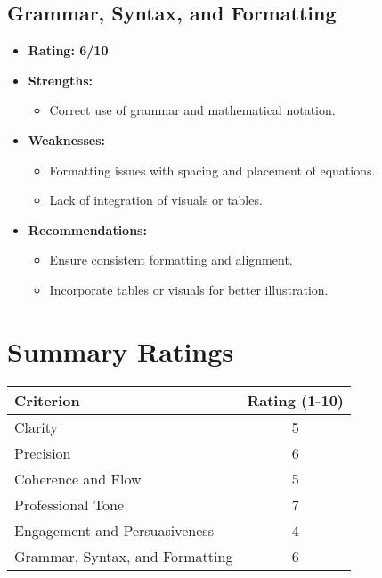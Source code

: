 \documentclass{article}
\begin{document}
\subsection{Grammar, Syntax, and Formatting}
\begin{itemize}
    \item \textbf{Rating: 6/10}
    \item \textbf{Strengths:}
    \begin{itemize}
        \item Correct use of grammar and mathematical notation.
    \end{itemize}
    \item \textbf{Weaknesses:}
    \begin{itemize}
        \item Formatting issues with spacing and placement of equations.
        \item Lack of integration of visuals or tables.
    \end{itemize}
    \item \textbf{Recommendations:}
    \begin{itemize}
        \item Ensure consistent formatting and alignment.
        \item Incorporate tables or visuals for better illustration.
    \end{itemize}
\end{itemize}

\section{Summary Ratings}
\begin{center}
\begin{tabular}{|l|c|}
\hline
\textbf{Criterion} & \textbf{Rating (1-10)} \\
\hline
Clarity & 5 \\
\hline
Precision & 6 \\
\hline
Coherence and Flow & 5 \\
\hline
Professional Tone & 7 \\
\hline
Engagement and Persuasiveness & 4 \\
\hline
Grammar, Syntax, and Formatting & 6 \\
\hline
\end{tabular}
\end{center}
\end{document}
